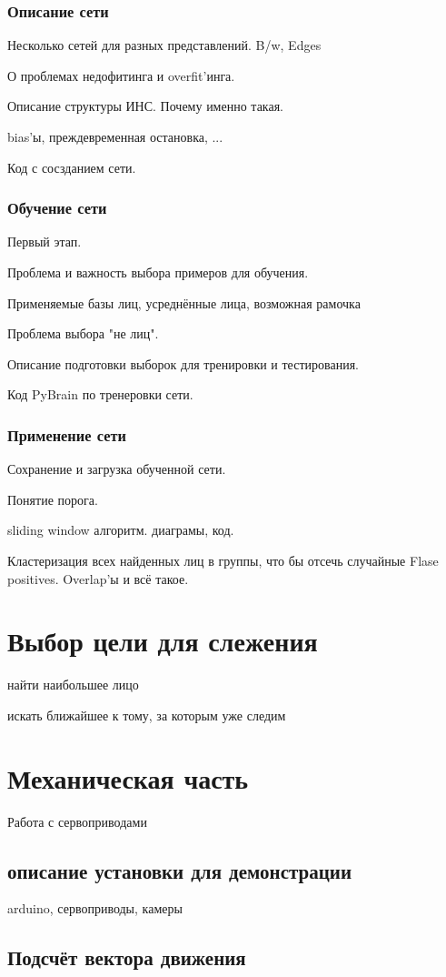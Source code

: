 \documentclass[12pt]{report}
\begin{document}
\subsubsection{Описание сети}
Несколько сетей для разных представлений. B/w, Edges

О проблемах недофитинга и overfit'инга.

Описание структуры ИНС. Почему именно такая.

bias'ы, преждевременная остановка, ...

Код с сосзданием сети.
\subsubsection{Обучение сети}
Первый этап.

Проблема и важность выбора примеров для обучения.

Применяемые базы лиц, усреднённые лица, возможная рамочка

Проблема выбора "не лиц".

Описание подготовки выборок для тренировки и тестирования.

Код PyBrain по тренеровки сети.
\subsubsection{Применение сети}
Сохранение и загрузка обученной сети.

Понятие порога.

sliding window алгоритм. диаграмы, код.

Кластеризация всех найденных лиц в группы, что бы отсечь случайные Flase positives. Overlap'ы и всё такое.
\section{Выбор цели для слежения}
найти наибольшее лицо

искать ближайшее к тому, за которым уже следим
\section{Механическая часть}
Работа с сервоприводами
\subsection{описание установки для демонстрации}
arduino,
сервоприводы,
камеры
\subsection{Подсчёт вектора движения}
\end{document}
